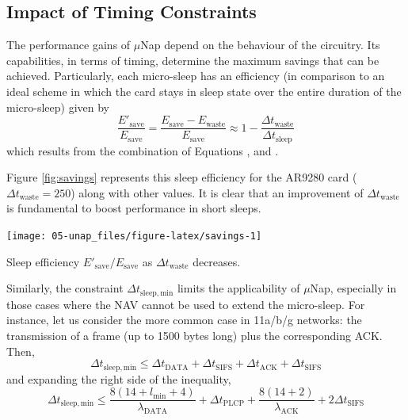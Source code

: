 \documentclass[twoside,nohyper]{tufte-book}
\makeatletter
\let\orig@maketag@@@\maketag@@@
\renewcommand{\eqref}[1]{\textup{\let\maketag@@@\orig@maketag@@@\tagform@{\ref{#1}}}}
\def\maketag@@@#1{\hbox{\rlap{\kern\marginparsep\m@th\normalfont#1}\kern1sp}}
\theoremstyle{definition}
\theoremstyle{definition}
\theoremstyle{definition}
\theoremstyle{remark}
\makeatother
\begin{document}
\hypertarget{impact-of-timing-constraints}{%
\subsection{Impact of Timing
Constraints}\label{impact-of-timing-constraints}}

The performance gains of \(\mu\)Nap depend on the behaviour of the
circuitry. Its capabilities, in terms of timing, determine the maximum
savings that can be achieved. Particularly, each micro-sleep has an
efficiency (in comparison to an ideal scheme in which the card stays in
sleep state over the entire duration of the micro-sleep) given by
%
\begin{equation}
 \frac{E'_\mathrm{save}}{E_\mathrm{save}} = \frac{E_\mathrm{save} - E_\mathrm{waste}}{E_\mathrm{save}} \approx 1 - \frac{\Delta t_\mathrm{waste}}{\Delta t_\mathrm{sleep}}
 \label{eq:fracsave}
\end{equation}
%
which results from the combination of Equations \eqref{eq:idealsleep},
\eqref{eq:realsleep} and \eqref{eq:Ewaste}.

Figure \ref{fig:savings} represents this sleep efficiency for the AR9280
card (\(\Delta t_\mathrm{waste}=250\)) along with other values. It is
clear that an improvement of \(\Delta t_\mathrm{waste}\) is fundamental
to boost performance in short sleeps.




\begin{marginfigure}[-6in]

{\centering \texttt{[image: 05-unap\_files/figure-latex/savings-1]} 

}

\caption[Sleep efficiency \(E'_\mathrm{save}/E_\mathrm{save}\) as
\(\Delta t_\mathrm{waste}\) decreases.]{Sleep efficiency \(E'_\mathrm{save}/E_\mathrm{save}\) as
\(\Delta t_\mathrm{waste}\) decreases.}\label{fig:savings}
\end{marginfigure}

Similarly, the constraint \(\Delta t_\mathrm{sleep,min}\) limits the
applicability of \(\mu\)Nap, especially in those cases where the NAV
cannot be used to extend the micro-sleep. For instance, let us consider
the more common case in 11a/b/g networks: the transmission of a frame
(up to 1500 bytes long) plus the corresponding ACK. Then,
%
\begin{equation}
 \Delta t_\mathrm{sleep,min} \le \Delta t_\mathrm{DATA} + \Delta t_\mathrm{SIFS} + \Delta t_\mathrm{ACK} + \Delta t_\mathrm{SIFS} \label{eq:tsleepmin}
\end{equation}
%
and expanding the right side of the inequality,
%
\begin{equation*}
 \Delta t_\mathrm{sleep,min} \le \frac{8(14+l_\mathrm{min}+4)}{\lambda_\mathrm{DATA}} + \Delta t_\mathrm{PLCP} + \frac{8(14+2)}{\lambda_\mathrm{ACK}} + 2\Delta t_\mathrm{SIFS}
\end{equation*}
%
\end{document}
